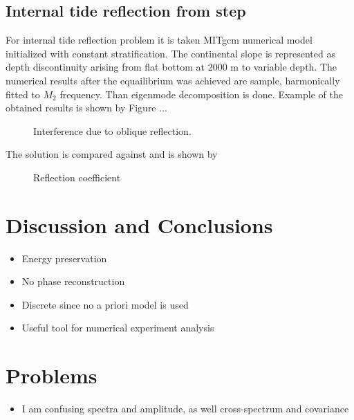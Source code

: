 \subsection{Internal tide reflection from step}
For internal tide reflection problem it is taken MITgcm numerical model initialized with constant stratification. The continental slope is represented as depth discontinuity arising from flat bottom at 2000 m to variable depth. The numerical results after the equailibrium was achieved are sample, harmonically fitted to $M_2$ frequency. Than eigenmode decomposition is done. Example of the obtained results is shown by Figure ...\\
\begin{figure}
\caption{Interference due to oblique reflection.}
\end{figure}
The solution is compared against \cite{chapman1981scattering} and is shown by
\begin{figure}
\caption{Reflection coefficient}
\end{figure}

\section{Discussion and Conclusions}
\begin{itemize}
\item Energy preservation
\item No phase reconstruction
\item Discrete since no a priori model is used
\item Useful tool for numerical experiment analysis
\end{itemize}




\section{Problems}
\begin{itemize}
\item I am confusing spectra and amplitude, as well cross-spectrum and covariance
\end{itemize}
